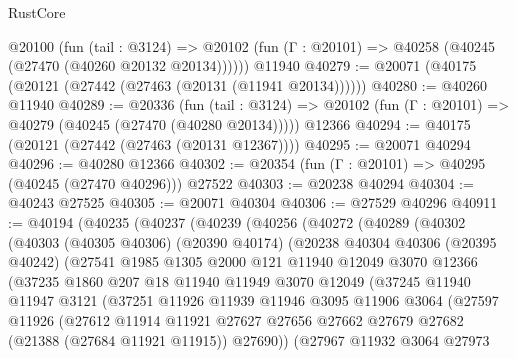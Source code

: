 \begin{lexlean}{RustCore}
\begin{coremodule}
    @20100
      (fun (tail : @3124) =>
      @20102 (fun (Γ : @20101) => @40258 (@40245 (@27470 (@40260 @20132 @20134))))))
    @11940
@40279 := @20071 (@40175 (@20121 (@27442 (@27463 (@20131 (@11941 @20134))))))
@40280 := @40260 @11940
@40289 := @20336
    (fun (tail : @3124) => @20102 (fun (Γ : @20101) => @40279 (@40245 (@27470 (@40280 @20134)))))
    @12366
@40294 := @40175 (@20121 (@27442 (@27463 (@20131 @12367))))
@40295 := @20071 @40294
@40296 := @40280 @12366
@40302 := @20354 (fun (Γ : @20101) => @40295 (@40245 (@27470 @40296))) @27522
@40303 := @20238 @40294
@40304 := @40243 @27525
@40305 := @20071 @40304
@40306 := @27529 @40296
@40911 := @40194
    (@40235
      (@40237
        (@40239
          (@40256
            (@40272
              (@40289
                (@40302
                  (@40303
                    (@40305 @40306)
                    (@20390 @40174)
                    (@20238
                      @40304
                      @40306
                      (@20395 @40242)
                      (@27541
                        @1985
                        @1305
                        @2000
                        @121
                        @11940
                        @12049
                        @3070
                        @12366
                        (@37235
                          @1860
                          @207
                          @18
                          @11940
                          @11949
                          @3070
                          @12049
                          (@37245
                            @11940
                            @11947
                            @3121
                            (@37251
                              @11926
                              @11939
                              @11946
                              @3095
                              @11906
                              @3064
                              (@27597
                                @11926
                                (@27612
                                  @11914
                                  @11921
                                  @27627
                                  @27656
                                  @27662
                                  @27679
                                  @27682
                                  (@21388 (@27684 @11921 @11915))
                                  @27690))
                              (@27967
                                @11932
                                @3064
                                @27973

\end{coremodule}
\end{lexlean}
